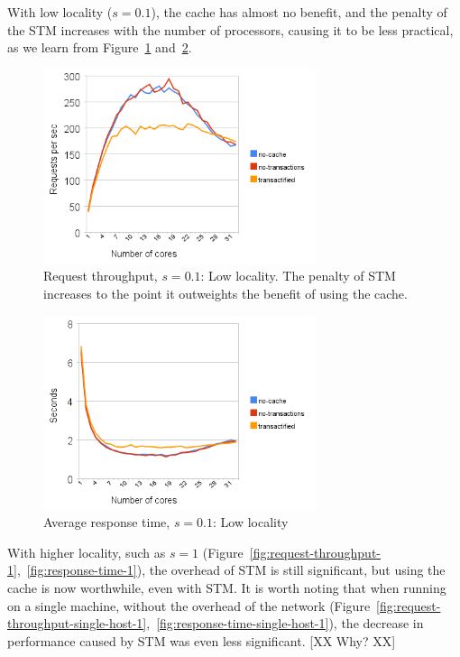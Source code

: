 \documentclass[preprint,natbib,11pt]{sigplanconf}
\begin{document}
With low locality ($s=0.1$), the cache has almost no benefit, and the penalty of
the STM increases with the number of processors, causing it to be less
practical, as we learn from Figure~\ref{fig:request-throughput-0.1}
and~\ref{fig:response-time-0.1}. 

\begin{figure}
 \begin{center}
  \includegraphics[width=8cm]{transaction-rate-client-server-0dot1.png}
 \end{center}
 \caption{Request throughput, $s = 0.1$: Low locality.
          The penalty of STM increases to the point it outweights the benefit of
          using the cache.} 
 \label{fig:request-throughput-0.1}
\end{figure}
\begin{figure}
 \begin{center}
  \includegraphics[width=8cm]{response-time-client-server-0dot1.png}
 \end{center}
 \caption{Average response time, $s = 0.1$: Low locality}
 \label{fig:response-time-0.1}
\end{figure}

With higher locality, such as $s=1$
(Figure~\ref{fig:request-throughput-1},~\ref{fig:response-time-1}), the overhead
of STM is still significant, but using the cache is now worthwhile, even with
STM. It is worth noting that when running on a single machine, without the
overhead of the network
(Figure~\ref{fig:request-throughput-single-host-1},~\ref{fig:response-time-single-host-1}),
the decrease in performance caused by STM was even less significant. [XX Why?
XX]
\end{document}
